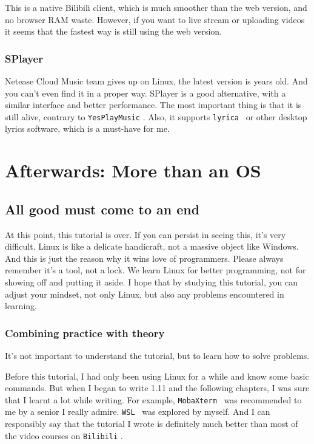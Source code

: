 \documentclass[lang=en,color=blue,12pt]{elegantbook}
\let\oldtexttt\texttt
\renewcommand{\texttt}[1]{%
  \begingroup
  \setlength{\fboxsep}{1pt}%
  \colorbox{gray!10}{\oldtexttt{#1}}%
  \endgroup
}
\begin{document}
This is a native Bilibili client, which is much smoother than the web version,
and no browser RAM waste. However, if you want to live stream or uploading
videos it seems that the fastest way is still using the web version.

\subsection{SPlayer}

Netease Cloud Music team gives up on Linux, the latest version is years old.
And you can't even find it in a proper way. SPlayer is a good alternative,
with a similar interface and better performance. The most important thing is that
it is still alive, contrary to \texttt{YesPlayMusic}. Also, it supports
\texttt{lyrica}\ or other desktop lyrics software, which is a must-have for me.


\chapter*{Afterwards: More than an OS}

\section*{All good must come to an end}

At this point, this tutorial is over. If you can persist in seeing this,
it's very difficult. Linux is like a delicate handicraft, not a massive object
like Windows. And this is just the reason why it wins love of programmers.
Please always remember it's a tool, not a lock. We learn Linux for better
programming, not for showing off and putting it aside. I hope that by
studying this tutorial, you can adjust your mindset, not only Linux, but
also any problems encountered in learning.

\subsection*{Combining practice with theory}

It's not important to understand the tutorial, but to learn how to solve problems.

Before this tutorial, I had only been using Linux for a while and know
some basic commands. But when I began to write 1.11 and the following
chapters, I was sure that I learnt a lot while writing. For example,
\texttt{MobaXterm}\ was recommended to me by a senior I really admire.
\texttt{WSL}\ was explored by myself. And I can responsibly say that
the tutorial I wrote is definitely much better than most of the video
courses on \texttt{Bilibili}.
\end{document}
